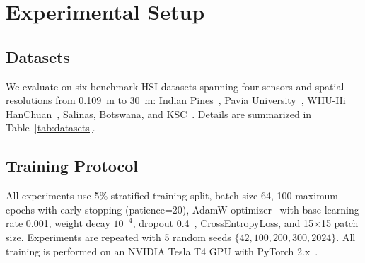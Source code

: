 \documentclass[conference]{IEEEtran}
\begin{document}
{%
\section{Experimental Setup}

\subsection{Datasets}

We evaluate on six benchmark HSI datasets spanning four sensors and spatial resolutions from 0.109~m to 30~m: Indian Pines~\cite{baumgardner2015indian}, Pavia University~\cite{gamba2004pavia}, WHU-Hi HanChuan~\cite{zhong2020whu}, Salinas, Botswana, and KSC~\cite{gic2020hyperspectral}. Details are summarized in Table~\ref{tab:datasets}.

\begin{table}[!t]
\caption{Benchmark HSI Datasets}
\label{tab:datasets}
\centering
{}
\end{table}

\subsection{Training Protocol}

All experiments use 5\% stratified training split, batch size 64, 100 maximum epochs with early stopping (patience=20), AdamW optimizer~\cite{loshchilov2019decoupled} with base learning rate 0.001, weight decay $10^{-4}$, dropout 0.4~\cite{srivastava2014dropout}, CrossEntropyLoss, and 15$\times$15 patch size. Experiments are repeated with 5 random seeds $\{42, 100, 200, 300, 2024\}$. All training is performed on an NVIDIA Tesla T4 GPU with PyTorch 2.x~\cite{paszke2019pytorch}.

}
\end{document}
